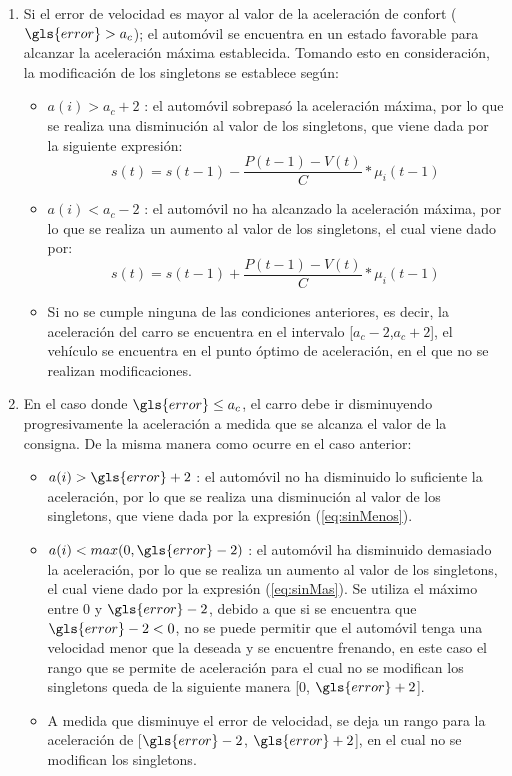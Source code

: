 \begin{enumerate}
\item Si el error de velocidad es mayor al valor de la aceleración de confort ($\gls{error}>a_c$); el automóvil se encuentra en un estado favorable para alcanzar la aceleración máxima establecida. Tomando esto en consideración, la modificación de los singletons se establece según:
\begin{itemize}
\item $a(i) > a_c +2$ : el automóvil sobrepasó la aceleración máxima, por lo que se realiza una disminución al valor de los singletons, que viene dada por la siguiente expresión:
\begin{equation}\label{eq:sinMenos}
s(t) = s(t-1) - \frac{P(t-1)-V(t)}{C}*\mu_{i}(t-1)
\end{equation}
\item $a(i) < a_c -2$ : el automóvil no ha alcanzado la aceleración máxima, por lo que se realiza un aumento al valor de los singletons, el cual viene dado por:
\begin{equation}\label{eq:sinMas}
s(t) = s(t-1) + \frac{P(t-1)-V(t)}{C}*\mu_{i}(t-1)
\end{equation}
\item Si no se cumple ninguna de las condiciones anteriores, es decir, la aceleración del carro se encuentra en el intervalo [$a_c -2$,$a_c +2$], el vehículo se encuentra en el punto óptimo de aceleración, en el que no se realizan modificaciones.
\end{itemize}
 

\item En el caso donde $\gls{error} \leq a_c$, el carro debe ir disminuyendo progresivamente la aceleración a medida que se alcanza el valor de la consigna. De la misma manera como ocurre en el caso anterior:

\begin{itemize}
\item $a(i) > \gls{error}+2$ : el automóvil no ha disminuido lo suficiente la aceleración, por lo que se realiza una disminución al valor de los singletons, que viene dada por la expresión (\ref{eq:sinMenos}).
\item $a(i) < max(0,\gls{error}-2)$ : el automóvil ha disminuido demasiado la aceleración, por lo que se realiza un aumento al valor de los singletons, el cual viene dado por la expresión (\ref{eq:sinMas}). Se utiliza el máximo entre $0$ y $\gls{error}-2$, debido a que si se encuentra que $\gls{error}-2 < 0$, no se puede permitir que el automóvil tenga una velocidad menor que la deseada y se encuentre frenando, en este caso el rango que se permite de aceleración para el cual no se modifican los singletons queda de la siguiente manera [$0$, $\gls{error}+2$].

\item A medida que disminuye el error de velocidad, se deja un rango para la aceleración de [$\gls{error}-2$, $\gls{error}+2$], en el cual no se modifican los singletons.
\end{itemize}

\end{enumerate}


